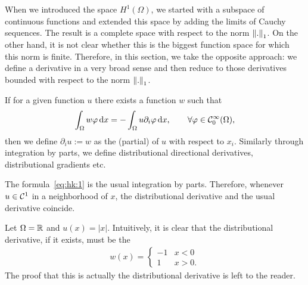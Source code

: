\begin{intro}
  When we introduced the space $H^1(\Omega)$, we started with a
  subspace of continuous functions and extended this space by adding
  the limits of Cauchy sequences. The result is a complete space with
  respect to the norm $\left\|.\right\|_1$. On the other hand, it is not clear
  whether this is the biggest function space for which this norm is
  finite. Therefore, in this section, we take the opposite approach:
  we define a derivative in a very broad sense and then reduce to
  those derivatives bounded with respect to the norm $\left\|.\right\|_1$.
\end{intro}

\begin{definition}
  If for a given function $u$ there exists a function $w$ such that
  \begin{gather}
    \label{eq:hk:1}
     \int_\Omega w \varphi \,\mathrm{d} x
     =
     -\int_\Omega u \partial_i \varphi \,\mathrm{d} x,
     \qquad\forall \varphi\in \mathcal C^\infty_0(\Omega),
  \end{gather}
  then we define $\partial_i u := w$ as the  (partial) of $u$ with respect to $x_i$. Similarly through
  integration by parts, we define distributional directional
  derivatives, distributional gradients etc.
\end{definition}

\begin{note}
  The formula~\eqref{eq:hk:1} is the usual integration by
  parts. Therefore, whenever $u\in\mathcal C^1$ in a neighborhood of $x$, the
  distributional derivative and the usual derivative coincide.
\end{note}

\begin{example}
  Let $\Omega=\mathbb R$ and $u(x) = |x|$. Intuitively,
  it is clear that the distributional derivative, if it exists, must
  be the 
  \begin{gather}
    \label{eq:hk:2}
    w(x) =
    \begin{cases}
      -1 & x<0 \\ 1 & x>0.
    \end{cases}
  \end{gather}
  The proof that this is actually the distributional derivative is
  left to the reader.
\end{example}

